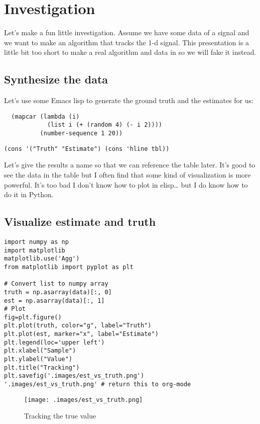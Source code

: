 \documentclass[11pt]{article}
\author{Niklas Carlsson}
\date{\today}
\title{}
\begin{document}
\section*{Investigation}
\label{sec:orgb877167}

Let's make a fun little investigation. Assume we have some data of a signal and
we want to make an algorithm that tracks the 1-d signal. This presentation is a
little bit too short to make a real algorithm and data in so we will fake it
instead.

\subsection*{Synthesize the data}
\label{sec:org1e53dcf}
Let's use some Emacs lisp to generate the ground truth and the estimates for us:

\begin{verbatim}
  (mapcar (lambda (i)
            (list i (+ (random 4) (- i 2))))
          (number-sequence 1 20))
\end{verbatim}

\begin{verbatim}
(cons '("Truth" "Estimate") (cons 'hline tbl))
\end{verbatim}

Let's give the results a name so that we can reference the table later. It's
good to see the data in the table but I often find that some kind of
visualization is more powerful. It's too bad I don't know how to plot in
elisp\ldots{} but I do know how to do it in Python.

\subsection*{Visualize estimate and truth}
\label{sec:orgf804e1c}
\begin{verbatim}
import numpy as np
import matplotlib
matplotlib.use('Agg')
from matplotlib import pyplot as plt

# Convert list to numpy array
truth = np.asarray(data)[:, 0]
est = np.asarray(data)[:, 1]
# Plot
fig=plt.figure()
plt.plot(truth, color="g", label="Truth")
plt.plot(est, marker="x", label="Estimate")
plt.legend(loc='upper left')
plt.xlabel("Sample")
plt.ylabel("Value")
plt.title("Tracking")
plt.savefig('.images/est_vs_truth.png')
'.images/est_vs_truth.png' # return this to org-mode
\end{verbatim}

\begin{figure}[htbp]
\centering
\texttt{[image: .images/est\_vs\_truth.png]}
\caption{Tracking the true value}
\end{figure}
\end{document}
